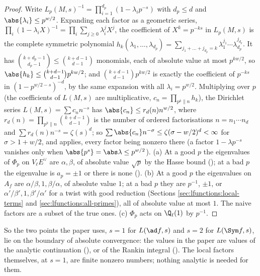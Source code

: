 \begin{proof}
Write $L_p(M,s)^{-1}=\prod_{i=1}^{d_p}(1-\lambda_ip^{-s})$ with $d_p\le d$ and $\abs{\lambda_i}\le p^{w/2}$. Expanding each factor as a geometric series,
$\prod_i(1-\lambda_iX)^{-1}=\prod_i\sum_{j\ge0}\lambda_i^jX^j$, the coefficient of $X^k=p^{-ks}$ in $L_p(M,s)$ is the complete symmetric polynomial
$h_k(\lambda_1,\dots,\lambda_{d_p})=\sum_{j_1+\dots+j_{d_p}=k}\lambda_1^{j_1}\cdots\lambda_{d_p}^{j_{d_p}}$. It has $\binom{k+d_p-1}{d_p-1}\le\binom{k+d-1}{d-1}$ monomials, each of absolute value at most
$p^{kw/2}$, so $\abs{h_k}\le\binom{k+d-1}{d-1}p^{kw/2}$; and $\binom{k+d-1}{d-1}p^{kw/2}$ is exactly the coefficient of $p^{-ks}$ in $(1-p^{w/2-s})^{-d}$, by the same expansion with all
$\lambda_i=p^{w/2}$. Multiplying over $p$ (the coefficients of $L(M,s)$ are multiplicative, $c_n=\prod_{p^k\| n}h_k$), the Dirichlet series $L(M,s)=\sum c_nn^{-s}$ has
$\abs{c_n}\le r_d(n)n^{w/2}$, where $r_d(n)=\prod_{p^k\|n}\binom{k+d-1}{d-1}$ is the number of ordered factorisations $n=n_1\cdots n_d$ and $\sum r_d(n)n^{-s}=\zeta(s)^d$; so $\sum\abs{c_n}n^{-\sigma}\le
\zeta(\sigma-w/2)^d<\infty$ for $\sigma>1+w/2$, and  applies, every factor being nonzero there (a factor $1-\lambda p^{-s}$ vanishes only when
$\abs{p^{s}}=\abs\lambda\le p^{w/2}$). (a) At a good $p$ the eigenvalues of $\Phi_p$ on $V_\ell E^\vee$ are $\alpha,\beta$, of absolute value $\sqrt p$ by the Hasse bound
(); at a bad $p$ the eigenvalue is $a_p=\pm1$ or there is none (). (b) At a good $p$ the eigenvalues on $A_f$ are
$\alpha/\beta,1,\beta/\alpha$, of absolute value $1$; at a bad $p$ they are $p^{-1}$, $\pm1$, or $\alpha'/\beta',1,\beta'/\alpha'$ for a twist with good reduction (Sections
\ref{sec:lfunctions:local-terms} and \ref{sec:lfunctions:all-primes}), all of absolute value at most $1$. The naive factors are a subset of the true ones. (c) $\Phi_p$ acts on
$\Q_\ell(1)$ by $p^{-1}$.
\end{proof}

So the two points the paper uses, $s=1$ for $L(\ad f,s)$ and $s=2$ for $L(\Sym f,s)$, lie on the boundary of absolute convergence: the values in the paper are
values of the analytic continuation (), or of the Rankin integral (). The local factors
themselves, at $s=1$, are finite nonzero numbers; nothing analytic is needed for them.

